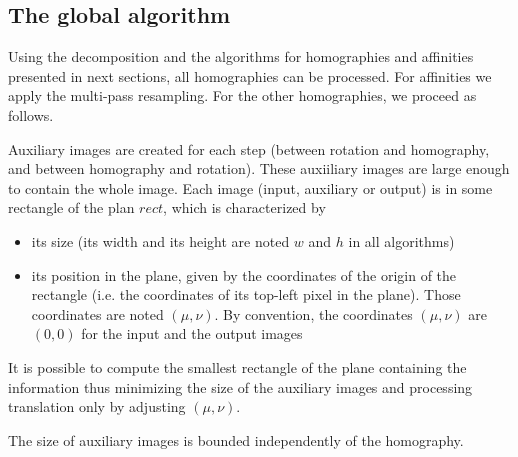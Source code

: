 \subsection{The global algorithm}
 \label{translainsta}
 
 Using the decomposition and the algorithms for homographies and affinities presented in next sections, all homographies can be processed. For affinities we apply the multi-pass resampling. For the other homographies, we proceed as follows.
  
 
 Auxiliary images are created for each step (between rotation and homography, and between homography and rotation). These auxiiliary images are large enough to contain the whole image. Each image (input, auxiliary or output) is in some rectangle of the plan $rect$, which is characterized by
 \begin{itemize}
  \item its size (its width and its height are noted $w$ and $h$ in all algorithms)
  \item its position in the plane, given by the coordinates of the origin of the rectangle (i.e. the coordinates of its top-left pixel in the plane). Those coordinates are noted $(\mu,\nu)$. By convention, the coordinates $(\mu,\nu)$ are $(0,0)$ for the input and the output images
 \end{itemize}
 It is possible to compute the smallest rectangle of the plane containing the information thus minimizing the size of the auxiliary images and processing translation only by adjusting $(\mu,\nu)$.
 
 \begin{prop}
 The size of auxiliary images is bounded independently of the homography.
 \end{prop}
 
 
 
